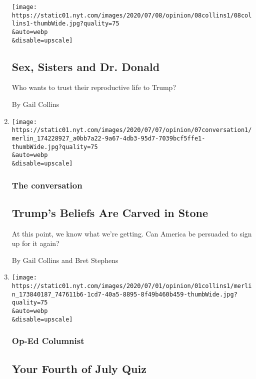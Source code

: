 \begin{enumerate}
  \texttt{[image: https://static01.nyt.com/images/2020/07/08/opinion/08collins1/08collins1-thumbWide.jpg?quality=75\\\&auto=webp\\\&disable=upscale]}

  \hypertarget{sex-sisters-and-dr-donald}{%
  \subsection{Sex, Sisters and Dr.
  Donald}\label{sex-sisters-and-dr-donald}}

  Who wants to trust their reproductive life to Trump?

  By Gail Collins
\item
  \href{/2020/07/07/opinion/trump-coronavirus-mount-rushmore.html}{}

  \texttt{[image: https://static01.nyt.com/images/2020/07/07/opinion/07conversation1/merlin\_174228927\_a0bb7a22-9a67-4db3-95d7-7039bcf5ffe1-thumbWide.jpg?quality=75\\\&auto=webp\\\&disable=upscale]}

  \hypertarget{the-conversation-3}{%
  \subsubsection{The conversation}\label{the-conversation-3}}

  \hypertarget{trumps-beliefs-are-carved-in-stone}{%
  \subsection{Trump's Beliefs Are Carved in
  Stone}\label{trumps-beliefs-are-carved-in-stone}}

  At this point, we know what we're getting. Can America be persuaded to
  sign up for it again?

  By Gail Collins and Bret Stephens
\item
  \href{/interactive/2020/07/01/opinion/4th-of-july-quiz.html}{}

  \texttt{[image: https://static01.nyt.com/images/2020/07/01/opinion/01collins1/merlin\_173840187\_747611b6-1cd7-40a5-8895-8f49b460b459-thumbWide.jpg?quality=75\\\&auto=webp\\\&disable=upscale]}

  \hypertarget{op-ed-columnist}{%
  \subsubsection{Op-Ed Columnist}\label{op-ed-columnist}}

  \hypertarget{your-fourth-of-july-quiz}{%
  \subsection{Your Fourth of July Quiz}\label{your-fourth-of-july-quiz}}


\end{enumerate}
